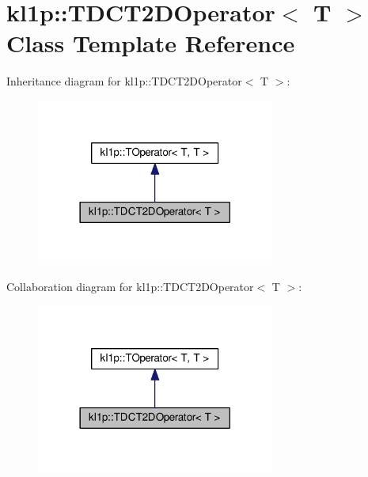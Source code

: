 \hypertarget{classkl1p_1_1TDCT2DOperator}{}\section{kl1p\+:\+:T\+D\+C\+T2\+D\+Operator$<$ T $>$ Class Template Reference}
\label{classkl1p_1_1TDCT2DOperator}


Inheritance diagram for kl1p\+:\+:T\+D\+C\+T2\+D\+Operator$<$ T $>$\+:
\nopagebreak
\begin{figure}[H]
\begin{center}
\leavevmode
\includegraphics[width=222pt]{classkl1p_1_1TDCT2DOperator__inherit__graph}
\end{center}
\end{figure}


Collaboration diagram for kl1p\+:\+:T\+D\+C\+T2\+D\+Operator$<$ T $>$\+:
\nopagebreak
\begin{figure}[H]
\begin{center}
\leavevmode
\includegraphics[width=222pt]{classkl1p_1_1TDCT2DOperator__coll__graph}
\end{center}
\end{figure}
